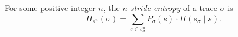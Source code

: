 \begin{definition} For some positive integer $n$, the
  \textit{$n$-stride entropy} of a trace $\sigma$ is
  \begin{equation*}
    H_{s^n}(\sigma) = \sum_{s\in s^n_\sigma} P_\sigma(s)\cdot H(s_\sigma\mid s).
  \end{equation*}
\end{definition}



